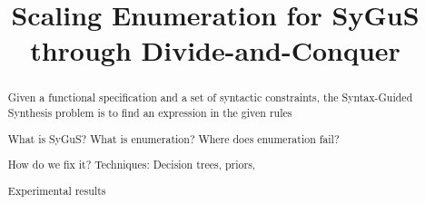 \documentclass{llncs}
\begin{document}
\title{Scaling Enumeration for SyGuS through Divide-and-Conquer}
\author{}
\institute{}
\maketitle

\vspace{-8ex}
\begin{abstract}
  Given a functional specification and a set of syntactic constraints,
  the Syntax-Guided Synthesis problem is to find an expression in the
  given rules

  What is SyGuS?
  What is enumeration?
  Where does enumeration fail?

  How do we fix it? Techniques:
  Decision trees, priors,

  Experimental results
\end{abstract}
\end{document}
